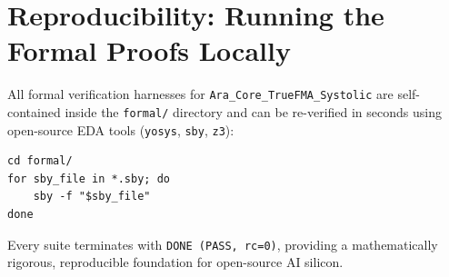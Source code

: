 \documentclass[journal,10pt,twocolumn]{IEEEtran}
\begin{document}
\section{Reproducibility: Running the Formal Proofs Locally}

All formal verification harnesses for \texttt{Ara\_Core\_TrueFMA\_Systolic} are self-contained inside the \texttt{formal/} directory and can be re-verified in seconds using open-source EDA tools (\texttt{yosys}, \texttt{sby}, \texttt{z3}):

\begin{footnotesize}\begin{verbatim}
cd formal/
for sby_file in *.sby; do
    sby -f "$sby_file"
done
\end{verbatim}\end{footnotesize}

Every suite terminates with \texttt{DONE (PASS, rc=0)}, providing a mathematically rigorous, reproducible foundation for open-source AI silicon.
\end{document}
